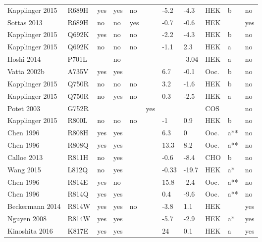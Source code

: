 \begin{tiny}
\begin{longtable}{p{4cm}|l|llll|ll|lll}
Kapplinger 2015\cite{Kapplinger2015MutationDB} & R689H & yes & yes & no &  & -5.2 & -4.3 & HEK & b & no \\
Sottas 2013\cite{Sottas2013MutationDB} & R689H & no & no & yes &  & -0.7 & -0.6 & HEK &  & yes \\
Kapplinger 2015\cite{Kapplinger2015MutationDB} & Q692K & yes & no & no &  & -2.2 & -4.3 & HEK & b & no \\
Kapplinger 2015\cite{Kapplinger2015MutationDB} & Q692K & no & no & no &  & -1.1 & 2.3 & HEK & a & no \\
Hoshi 2014\cite{Hoshi2014MutationDB} & P701L &  & no &  &  &  & -3.04 & HEK & a & no \\
Vatta 2002b\cite{Vatta2002bMutationDB} & A735V & yes & yes &  &  & 6.7 & -0.1 & Ooc. & b & no \\
Kapplinger 2015\cite{Kapplinger2015MutationDB} & Q750R & no & no & no &  & 3.2 & -1.6 & HEK & b & no \\
Kapplinger 2015\cite{Kapplinger2015MutationDB} & Q750R & no & yes & no &  & 0.3 & -2.5 & HEK & a & no \\
Potet 2003\cite{Potet2003MutationDB} & G752R &  &  &  & yes &  &  & COS &  & no \\
Kapplinger 2015\cite{Kapplinger2015MutationDB} & R800L & no & no & no &  & -1 & 0.9 & HEK & b & no \\
Chen 1996\cite{Chen1996MutationDB} & R808H & yes & yes &  &  & 6.3 & 0 & Ooc. & a** & no \\
Chen 1996\cite{Chen1996MutationDB} & R808Q & yes & yes &  &  & 13.3 & 8.2 & Ooc. & a** & no \\
Calloe 2013\cite{Calloe2013MutationDB} & R811H & no & yes &  &  & -0.6 & -8.4 & CHO & b & no \\
Wang 2015\cite{Wang2015MutationDB} & L812Q & no & yes &  &  & -0.33 & -19.7 & HEK & a* & no \\
Chen 1996\cite{Chen1996MutationDB} & R814E & yes & no &  &  & 15.8 & -2.4 & Ooc. & a** & no \\
Chen 1996\cite{Chen1996MutationDB} & R814Q & yes & yes &  &  & 0.4 & -9.6 & Ooc. & a** & no \\
Beckermann 2014\cite{Beckermann2014MutationDB} & R814W & yes & yes & no &  & -3.8 & 1.1 & HEK &  & yes \\
Nguyen 2008\cite{Nguyen2008MutationDB} & R814W & yes & yes &  &  & -5.7 & -2.9 & HEK & a* & yes \\
Kinoshita 2016\cite{Kinoshita2016MutationDB} & K817E & yes & yes &  &  & 24 & 0.1 & HEK & a & yes \\

\end{longtable}
\end{tiny}
